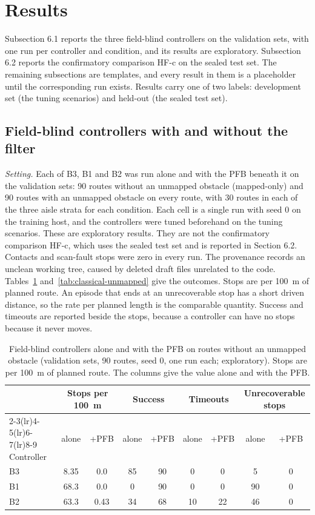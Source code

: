 \section{Results}

Subsection 6.1 reports the three field-blind controllers on the validation sets, with one run per controller and condition, and its results are exploratory. Subsection 6.2 reports the confirmatory comparison HF-c on the sealed test set. The remaining subsections are templates, and every result in them is a placeholder until the corresponding run exists. Results carry one of two labels: development set (the tuning scenarios) and held-out (the sealed test set).

\subsection{Field-blind controllers with and without the filter}

\emph{Setting.} Each of B3, B1 and B2 was run alone and with the PFB beneath it on the validation sets: 90 routes without an unmapped obstacle (mapped-only) and 90 routes with an unmapped obstacle on every route, with 30 routes in each of the three aisle strata for each condition. Each cell is a single run with seed 0 on the training host, and the controllers were tuned beforehand on the tuning scenarios. These are exploratory results. They are not the confirmatory comparison HF-c, which uses the sealed test set and is reported in Section 6.2. Contacts and scan-fault stops were zero in every run. The provenance records an unclean working tree, caused by deleted draft files unrelated to the code. Tables~\ref{tab:classical-mapped} and~\ref{tab:classical-unmapped} give the outcomes. Stops are per 100~m of planned route. An episode that ends at an unrecoverable stop has a short driven distance, so the rate per planned length is the comparable quantity. Success and timeouts are reported beside the stops, because a controller can have no stops because it never moves.

\begin{table}[t]
\caption{Field-blind controllers alone and with the PFB on routes without an unmapped obstacle (validation sets, 90 routes, seed 0, one run each; exploratory). Stops are per 100~m of planned route. The columns give the value alone and with the PFB.}
\label{tab:classical-mapped}
\centering
\small
\setlength{\tabcolsep}{4pt}
\begin{tabular}{lcccccccc}
\toprule
 & \multicolumn{2}{c}{Stops per 100~m} & \multicolumn{2}{c}{Success} & \multicolumn{2}{c}{Timeouts} & \multicolumn{2}{c}{Unrecoverable stops} \\
\cmidrule(lr){2-3}\cmidrule(lr){4-5}\cmidrule(lr){6-7}\cmidrule(lr){8-9}
Controller & alone & +PFB & alone & +PFB & alone & +PFB & alone & +PFB \\
\midrule
B3 & 8.35 & 0.0  & 85 & 90 & 0  & 0  & 5  & 0 \\
B1 & 68.3 & 0.0  & 0  & 90 & 0  & 0  & 90 & 0 \\
B2 & 63.3 & 0.43 & 34 & 68 & 10 & 22 & 46 & 0 \\
\bottomrule
\end{tabular}
\end{table}

